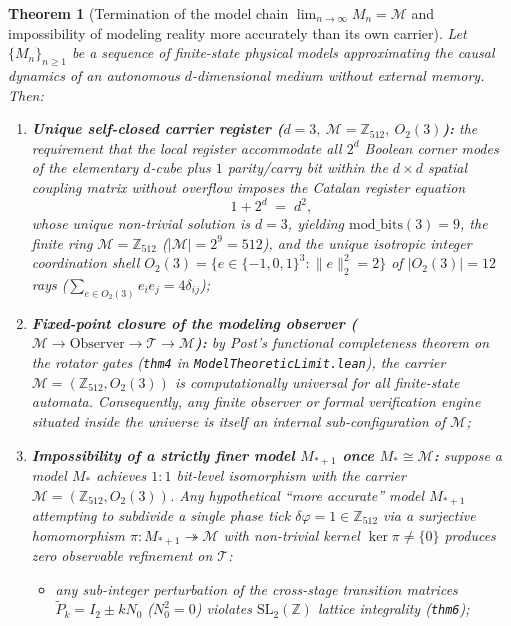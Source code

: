 \documentclass[11pt,a4paper]{article}
\newtheorem{theorem}{Theorem}[section]
\theoremstyle{definition}
\theoremstyle{remark}
\begin{document}
\begin{theorem}[Termination of the model chain $\lim_{n\to\infty} M_n = \mathcal{M}$ and impossibility of modeling reality more accurately than its own carrier]
\label{thm:model-chain-termination}
Let $\{M_n\}_{n\ge 1}$ be a sequence of finite-state physical models approximating the causal dynamics of an autonomous $d$-dimensional medium without external memory. Then:
\begin{enumerate}[label=\textbf{(\roman*)},leftmargin=*]
\item \textbf{Unique self-closed carrier register ($d=3,\ \mathcal{M}=\mathbb{Z}_{512},\ O_2(3)$):}
  the requirement that the local register accommodate all $2^d$ Boolean corner modes of the elementary $d$-cube plus $1$ parity/carry bit within the $d\times d$ spatial coupling matrix without overflow imposes the Catalan register equation
  \begin{equation}
    \label{eq:catalan-closure}
    1 + 2^d \;=\; d^2,
  \end{equation}
  whose unique non-trivial solution is $d = 3$, yielding $\mathrm{mod\_bits}(3) = 9$, the finite ring $\mathcal{M} = \mathbb{Z}_{512}$ ($|\mathcal{M}| = 2^9 = 512$), and the unique isotropic integer coordination shell $O_2(3) = \{e\in\{-1,0,1\}^3 : \|e\|_2^2 = 2\}$ of $|O_2(3)| = 12$ rays ($\sum_{e\in O_2(3)} e_i e_j = 4\delta_{ij}$);
\item \textbf{Fixed-point closure of the modeling observer ($\mathcal{M} \to \text{Observer} \to \mathcal{T} \to \mathcal{M}$):}
  by Post's functional completeness theorem on the rotator gates (\texttt{thm4} in \texttt{ModelTheoreticLimit.lean}), the carrier $\mathcal{M} = (\mathbb{Z}_{512}, O_2(3))$ is computationally universal for all finite-state automata. Consequently, any finite observer or formal verification engine situated inside the universe is itself an internal sub-configuration of $\mathcal{M}$;
\item \textbf{Impossibility of a strictly finer model $M_{*+1}$ once $M_* \cong \mathcal{M}$:}
  suppose a model $M_*$ achieves $1:1$ bit-level isomorphism with the carrier $\mathcal{M} = (\mathbb{Z}_{512}, O_2(3))$. Any hypothetical ``more accurate'' model $M_{*+1}$ attempting to subdivide a single phase tick $\delta\varphi = 1\in\mathbb{Z}_{512}$ via a surjective homomorphism $\pi : M_{*+1} \twoheadrightarrow \mathcal{M}$ with non-trivial kernel $\ker\pi \ne \{0\}$ produces zero observable refinement on $\mathcal{T}$:
  \begin{itemize}[noitemsep]
  \item any sub-integer perturbation of the cross-stage transition matrices $\widetilde{P}_k = I_2 \pm k N_0$ ($N_0^2 = 0$) violates $\mathrm{SL}_2(\mathbb{Z})$ lattice integrality (\texttt{thm6});

\end{itemize}
\end{enumerate}
\end{theorem}
\end{document}

